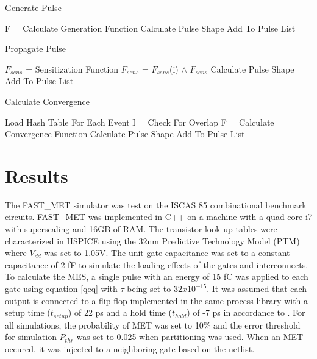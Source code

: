 \begin{algorithm}
	\caption{Generate Pulse} 
	\begin{algorithmic} [1]
		\STATE F = Calculate Generation Function
			\STATE Calculate Pulse Shape
			\STATE Add To Pulse List
		\ENDIF		
	\end{algorithmic}
\end{algorithm}

\begin{algorithm}
	\caption{Propagate Pulse} 
	\begin{algorithmic} [1]
			\STATE $F_{sens}$ = Sensitization Function
				\STATE $F_{sens}$ = $F_{sens}$(i) $\land$ $F_{sens}$
			\ENDFOR		
				\STATE Calculate Pulse Shape
				\STATE Add To Pulse List
			\ENDIF
	\end{algorithmic}
\end{algorithm}

\begin{algorithm}
	\caption{Calculate Convergence} 
	\begin{algorithmic} [1]
		\STATE Load Hash Table For Each Event
			\STATE I = Check For Overlap
				\STATE F = Calculate Convergence Function
					\STATE Calculate Pulse Shape
					\STATE Add To Pulse List
				\ENDIF
			\ENDIF
		\ENDFOR	
	\end{algorithmic}
\end{algorithm}
	
\section{Results} \label{ch3:results}

The FAST\_MET simulator was test on the ISCAS 85 combinational benchmark circuits. FAST\_MET was implemented in C++ on a machine with a quad core i7 with superscaling and 16GB of RAM. The transistor look-up tables were characterized in HSPICE using the 32nm Predictive Technology Model (PTM) \cite{PTM} where $V_{dd}$ was set to 1.05V. The unit gate capacitance was set to a constant capacitance of 2 fF to simulate the loading effects of the gates and interconnects. To calculate the MES, a single pulse with an energy of 15 fC was applied to each gate using equation \ref{qeq} with $\tau$ being set to $32x10^{-15}$. It was assumed that each output is connected to a flip-flop implemented in the same process library with a setup time ($t_{setup}$) of 22 ps and a hold time ($t_{hold}$) of -7 ps in accordance to \cite{Nunes2013}. For all simulations, the probability of MET was set to 10\% and the error threshold for simulation $P_{thr}$ was set to 0.025 when partitioning was used. When an MET occured, it was injected to a neighboring gate based on the netlist.

